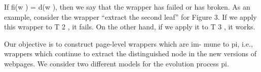If fi(w ) = d(w ), then we say that the wrapper has failed or has
broken. As an example, consider the wrapper “extract the second
leaf” for Figure 3. If we apply this wrapper to T 2 , it fails. On the
other hand, if we apply it to T 3 , it works.

Our objective is to construct page-level wrappers which are im-
mune to pi, i.e., wrappers which continue to extract the distinguished
node in the new versions of webpages. We consider two different
models for the evolution process pi.

